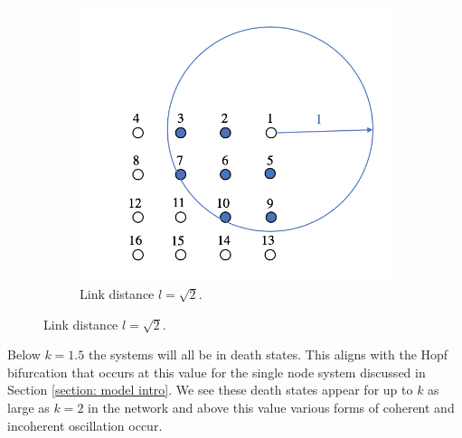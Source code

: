\documentclass[12pt]{article}
\begin{document}
\begin{figure}[h]
\begin{subfigure}[b]{0.4\linewidth}
    \includegraphics[width=\textwidth]{Xinzhu Section/link_dis_2.png}
    \caption{Link distance $l=\sqrt{2}$.}
    \end{subfigure}
    \label{fig:link distances}
\end{figure}
\noindent
Below $k=1.5$ the systems will all be in death states. This aligns with the Hopf bifurcation that occurs at this value for the single node system discussed in Section \ref{section: model intro}. We see these death states appear for up to $k$ as large as $k=2$ in the network and above this value various forms of coherent and incoherent oscillation occur.
\end{document}
